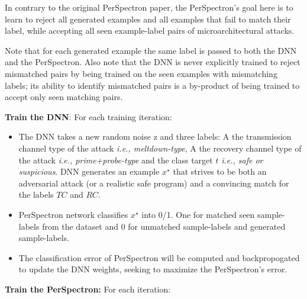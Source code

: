 \begin{note}
{In contrary to the original PerSpectron paper, the PerSpectron's goal here is to learn to reject all generated examples and all examples that fail to match their label, while accepting all seen example-label pairs of microarchitectural attacks.}
 \end{note}
 
 Note that for each generated example the same label is passed to both the DNN and the PerSpectron. Also note that the DNN is never explicitly trained to reject mismatched pairs by being trained on the seen examples with mismatching labels; its ability to identify mismatched pairs is a by-product of being trained to accept only seen matching pairs. 
 
 
\noindent\textbf{Train the DNN}:
For each training iteration:

\begin{itemize}  [topsep=0pt,parsep=0pt,partopsep=0pt, label={--}, leftmargin=*] %
\item  The DNN takes a new random noise z and three labels: A the transmission channel type of the attack {\em i.e., meltdown-type}, A the recovery channel type of the attack {\em i.e., prime+probe-type} and the class target $t$ {\em i.e., safe or suspicious}. DNN generates an example $x^{\star}$ that strives to be both an adversarial attack (or a realistic safe program) and a convincing match for the labels $TC$ and $RC$.  

\item PerSpectron network classifies $x^{\star}$ into 0/1. One for matched seen sample-labels from the dataset and 0 for unmatched sample-labels and generated sample-labels.    


\item  The classification error of PerSpectron will be computed and backpropogated to update the DNN weights, seeking to maximize the PerSpectron's error. 

\end{itemize}


\noindent\textbf{Train the PerSpectron:}
For each iteration:

